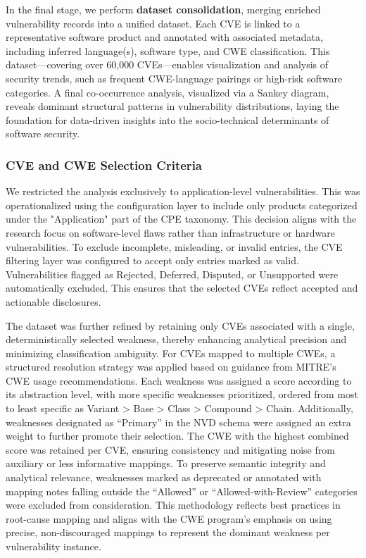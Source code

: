 In the final stage, we perform \textbf{dataset consolidation}, merging enriched vulnerability records into a unified dataset. Each CVE is linked to a representative software product and annotated with associated metadata, including inferred language(s), software type, and CWE classification. This dataset—covering over 60,000 CVEs—enables visualization and analysis of security trends, such as frequent CWE-language pairings or high-risk software categories. A final co-occurrence analysis, visualized via a Sankey diagram, reveals dominant structural patterns in vulnerability distributions, laying the foundation for data-driven insights into the socio-technical determinants of software security.

\subsubsection{CVE and CWE Selection Criteria}
We restricted the analysis exclusively to application-level vulnerabilities. This was operationalized using the configuration layer to include only products categorized under the "Application" part of the \ac{CPE} taxonomy. This decision aligns with the research focus on software-level flaws rather than infrastructure or hardware vulnerabilities. To exclude incomplete, misleading, or invalid entries, the \ac{CVE} filtering layer was configured to accept only entries marked as valid. Vulnerabilities flagged as Rejected, Deferred, Disputed, or Unsupported were automatically excluded. This ensures that the selected CVEs reflect accepted and actionable disclosures.

The dataset was further refined by retaining only CVEs associated with a single, deterministically selected weakness, thereby enhancing analytical precision and minimizing classification ambiguity. For CVEs mapped to multiple CWEs, a structured resolution strategy was applied based on guidance from MITRE’s CWE usage recommendations. Each weakness was assigned a score according to its abstraction level, with more specific weaknesses prioritized, ordered from most to least specific as Variant > Base > Class > Compound > Chain. Additionally, weaknesses designated as “Primary” in the NVD schema were assigned an extra weight to further promote their selection. The CWE with the highest combined score was retained per CVE, ensuring consistency and mitigating noise from auxiliary or less informative mappings. To preserve semantic integrity and analytical relevance, weaknesses marked as deprecated or annotated with mapping notes falling outside the “Allowed” or “Allowed-with-Review” categories were excluded from consideration. This methodology reflects best practices in root-cause mapping and aligns with the CWE program’s emphasis on using precise, non-discouraged mappings to represent the dominant weakness per vulnerability instance.

